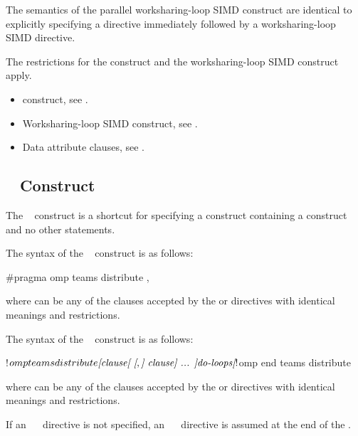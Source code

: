 \descr
The semantics of the parallel worksharing-loop SIMD construct are identical 
to explicitly specifying a  directive immediately followed by 
a worksharing-loop SIMD directive.

\restrictions
The restrictions for the  construct and the worksharing-loop 
SIMD construct apply.

\crossreferences
\begin{itemize}
\item {} construct, see
.

\item Worksharing-loop SIMD construct, see
.

\item Data attribute clauses, see
.
\end{itemize}



\subsection{~ Construct}
\label{subsec:teams distribute Construct}
\summary
The ~ construct is a shortcut for specifying 
a  construct containing a  construct and no 
other statements.

\syntax
\begin{ccppspecific}
The syntax of the ~ construct is as follows:

\begin{ompcPragma}
#pragma omp teams distribute \plc{[clause[ [},\plc{] clause] ... ] new-line}
\end{ompcPragma}

where  can be any of the clauses accepted by the  
or  directives with identical meanings and restrictions.
\end{ccppspecific}

\begin{fortranspecific}
The syntax of the ~ construct is as follows:

\begin{ompfPragma}
!$omp teams distribute \plc{[clause[ [},\plc{] clause] ... ]}
    \plc{do-loops}
\plc{[}!$omp end teams distribute\plc{]}
\end{ompfPragma}

where  can be any of the clauses accepted by the  
or  directives with identical meanings and restrictions.

If an ~~ directive is not specified, an
~~ directive is assumed at the end of 
the .
\end{fortranspecific}

